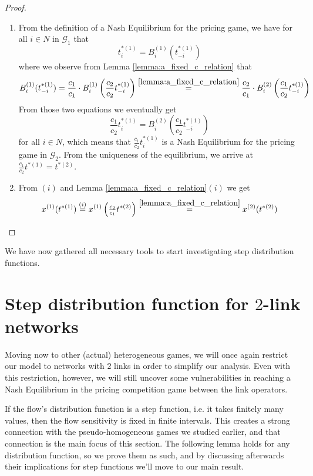 \documentclass[10pt,a4paper]{book}
\newcommand{\Gm}{\mathcal{G}}
\theoremstyle{definition}
\theoremstyle{comment}
\begin{document}
\begin{proof}
	\begin{enumerate}[$(i)$]
		\item From the definition of a Nash Equilibrium for the pricing game, we have for all $i \in N$ in $\Gm_1$ that
		\[
			t_i^{*(1)} = B_i^{(1)}(t_{-i}^{*(1)})
		\]
		where we observe from Lemma \ref{lemma:a_fixed_c_relation} that
		\[
			B_i^{(1)}(t_{-i}^{*(1)}) = \frac{c_1}{c_1} \cdot B_i^{(1)}\left(\frac{c_2}{c_2} t_{-i}^{*(1)}\right) \stackrel{\ref{lemma:a_fixed_c_relation}}{=} \frac{c_2}{c_1} \cdot B_i^{(2)}\left(\frac{c_1}{c_2}t_{-i}^{*(1)}\right)
		\]
		From those two equations we eventually get
		\[
			\frac{c_1}{c_2} t_i^{*(1)} = B_i^{(2)}\left(\frac{c_1}{c_2} t_{-i}^{*(1)}\right)
		\]
		for all $i \in N$, which means that $\tfrac{c_1}{c_2} t_i^{*(1)}$ is a Nash Equilibrium for the pricing game in $\Gm_2$.
		From the uniqueness of the equilibrium, we arrive at $\tfrac{c_1}{c_2} t^{*(1)} = t^{*(2)}$.
		\item From $(i)$ and Lemma \ref{lemma:a_fixed_c_relation}$(i)$  we get
		\[
			x^{(1)}(t^{*(1)}) \stackrel{(i)}{=} x^{(1)}\left(\tfrac{c_2}{c_1}t^{*(2)}\right) \stackrel{\ref{lemma:a_fixed_c_relation}}{=} x^{(2)}(t^{*(2)})
		\]
	\end{enumerate}
\end{proof}

We have now gathered all necessary tools to start investigating step distribution functions.

\section{Step distribution function for $2$-link networks}

Moving now to other (actual) heterogeneous games, we will once again restrict our model to networks with $2$ links in order to simplify our analysis.
Even with this restriction, however, we will still uncover some vulnerabilities in reaching a Nash Equilibrium in the pricing competition game between the link operators.

If the flow's distribution function is a step function, i.e. it takes finitely many values, then the flow sensitivity is fixed in finite intervals.
This creates a strong connection with the pseudo-homogeneous games we studied earlier, and that connection is the main focus of this section.
The following lemma holds for any distribution function, so we prove them as such, and by discussing afterwards their implications for step functions we'll move to our main result.
\end{document}
